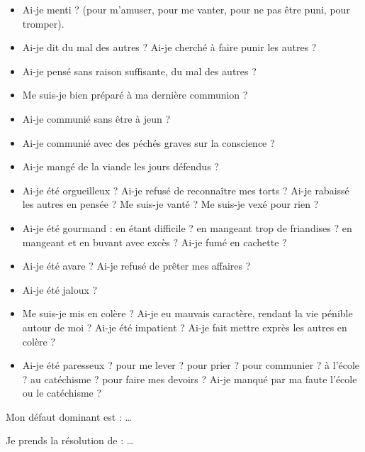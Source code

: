 \begin{itemize}
\item Ai-je menti ? (pour m’amuser, pour me vanter, pour ne pas être puni, pour tromper).
\item Ai-je dit du mal des autres ? Ai-je cherché à faire punir les autres ?
\item  Ai-je pensé sans raison suffisante, du mal des autres ?
\end{itemize}



\begin{itemize}
\item Me suis-je bien préparé à ma dernière
 communion ?
\item Ai-je communié sans être à jeun ?
\item Ai-je communié avec des péchés graves sur la conscience ?
\item Ai-je mangé de la viande les jours défendus ?
\end{itemize}



\begin{itemize}
\item Ai-je été orgueilleux ? Ai-je refusé de reconnaître mes torts ? Ai-je rabaissé les autres en pensée ? Me suis-je vanté ? Me suis-je vexé pour rien ?
\item Ai-je été gourmand : en étant difficile ? en mangeant trop de friandises ? en
mangeant et en buvant avec excès ? Ai-je fumé en cachette ?
\item Ai-je été avare ? Ai-je refusé de prêter mes affaires ?
\item Ai-je été jaloux ?
\item Me suis-je mis en colère ? Ai-je eu mauvais caractère, rendant la vie pénible
autour de moi ? Ai-je été impatient ? Ai-je fait mettre exprès les autres en colère ?
\item Ai-je été paresseux ? pour me lever ? pour prier ? pour communier ? à l’école ? au catéchisme ? pour faire mes devoirs ? Ai-je manqué par ma faute l’école ou le catéchisme ?
\end{itemize}

Mon défaut dominant est : …

Je prends la résolution de : …


